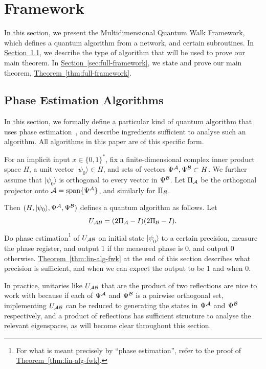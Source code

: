 \documentclass{article}
\renewcommand{\sec}[1]{\hyperref[sec:#1]{Section~\ref*{sec:#1}}}
\newcommand{\thm}[1]{\hyperref[thm:#1]{Theorem~\ref*{thm:#1}}}
\def\ket#1{{\lvert}#1\rangle}
\renewcommand{\>}{\rangle}
\newcommand{\<}{\langle}
\renewcommand{\(}{\left(}
\renewcommand{\)}{\right)}
\begin{document}
\section{Framework}\label{sec:fwk}

In this section, we present the Multidimensional Quantum Walk Framework, which defines a quantum algorithm from a network, and certain subroutines. In \sec{phase-est}, we describe the type of algorithm that will be used to prove our main theorem. In \sec{full-framework}, we state and prove our main theorem, \thm{full-framework}. 

\subsection{Phase Estimation Algorithms}\label{sec:phase-est}

In this section, we formally define a particular kind of quantum algorithm that uses phase estimation~\cite{kitaev1996PhaseEst}, and describe ingredients sufficient to analyse such an algorithm. All algorithms in this paper are of this specific form. 

\begin{definition}\label{def:lin-alg}
For an implicit input $x\in\{0,1\}^*$, fix a finite-dimensional complex inner product space $H$, a unit vector $\ket{\psi_0}\in H$, and sets of vectors
$\Psi^{\cal A},\Psi^{\cal B}\subset H$. We further assume that $\ket{\psi_0}$ is orthogonal to every vector in $\Psi^{\cal B}$.  Let $\Pi_{\cal A}$ be the orthogonal projector onto ${\cal A}=\mathrm{span}\{\Psi^{\cal A}\}$, and similarly for $\Pi_{\cal B}$.
\end{definition}
Then $(H,\ket{\psi_0},\Psi^{\cal A},\Psi^{\cal B})$ defines a quantum algorithm as follows. Let 
\begin{equation}
U_{\cal AB}=(2\Pi_{\cal A}-I)(2\Pi_{\cal B}-I).\label{eq:U-AB}
\end{equation}
Do phase estimation\footnote{For what is meant precisely by ``phase estimation'', refer to the proof of \thm{lin-alg-fwk}.} of $U_{\cal AB}$ on initial state $\ket{\psi_0}$ to a certain precision, measure the phase register, and output 1 if the measured phase is 0, and output 0 otherwise. \thm{lin-alg-fwk} at the end of this section describes what precision is sufficient, and when we can expect the output to be 1 and when 0. 

In practice, unitaries like $U_{\cal AB}$ that are the product of two reflections are nice to work with because if each of $\Psi^{\cal A}$ and $\Psi^{\cal B}$ is a pairwise orthogonal set, implementing $U_{\cal AB}$ can be reduced to generating the states in $\Psi^{\cal A}$ and $\Psi^{\cal B}$ respectively, and a product of reflections has sufficient structure to analyse the relevant eigenspaces, as will become clear throughout this section. 
\end{document}
